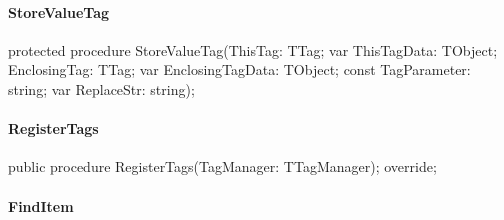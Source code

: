\documentclass{report}
\newif\ifpdf
\begin{document}
\paragraph*{StoreValueTag}\hspace*{\fill}

\label{PasDoc_Items.TPasEnum-StoreValueTag}
\begin{list}{}{
\setlength{\itemindent}{0cm}
\setlength{\listparindent}{0cm}
\setlength{\leftmargin}{\evensidemargin}
\addtolength{\leftmargin}{\tmplength}
\settowidth{\labelsep}{X}
\addtolength{\leftmargin}{\labelsep}
\setlength{\labelwidth}{\tmplength}
}
\item[\textbf{Declaration}\hfill]
\ifpdf
\begin{flushleft}
\fi
\begin{ttfamily}
protected procedure StoreValueTag(ThisTag: TTag; var ThisTagData: TObject; EnclosingTag: TTag; var EnclosingTagData: TObject; const TagParameter: string; var ReplaceStr: string);\end{ttfamily}

\ifpdf
\end{flushleft}
\fi

\end{list}
\paragraph*{RegisterTags}\hspace*{\fill}

\label{PasDoc_Items.TPasEnum-RegisterTags}
\begin{list}{}{
\setlength{\itemindent}{0cm}
\setlength{\listparindent}{0cm}
\setlength{\leftmargin}{\evensidemargin}
\addtolength{\leftmargin}{\tmplength}
\settowidth{\labelsep}{X}
\addtolength{\leftmargin}{\labelsep}
\setlength{\labelwidth}{\tmplength}
}
\item[\textbf{Declaration}\hfill]
\ifpdf
\begin{flushleft}
\fi
\begin{ttfamily}
public procedure RegisterTags(TagManager: TTagManager); override;\end{ttfamily}

\ifpdf
\end{flushleft}
\fi

\end{list}
\paragraph*{FindItem}\hspace*{\fill}
\end{document}
